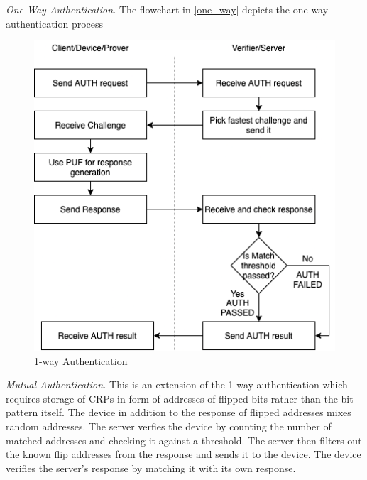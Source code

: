 \documentclass[journal, a4paper]{IEEEtran}
\begin{document}
\textit{One Way Authentication.} The flowchart in \ref{one_way} depicts the one-way authentication process

\begin{figure}[!hbt]
    \begin{center}
    \includegraphics[width=\columnwidth]{figs/authentication.png}
    \caption{1-way Authentication}
    \label{fig:one_way}
    \end{center}
\end{figure}

\textit{Mutual Authentication.} This is an extension of the 1-way authentication which requires storage of CRPs in form of addresses of flipped bits rather than the bit pattern itself. The device in addition to the response of flipped addresses mixes random addresses. The server verfies the device by counting the number of matched addresses and checking it against a threshold. The server then filters out the known flip addresses from the response and sends it to the device. The device verifies the server's response by matching it with its own response.
\end{document}
